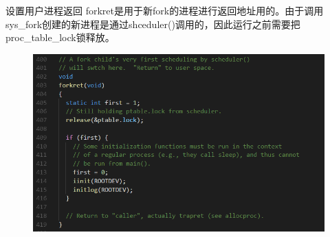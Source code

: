\documentclass[a4paper,12pt]{report}
\begin{document}
设置用户进程返回
forkret是用于新fork的进程进行返回地址用的。由于调用sys\_fork创建的新进程是通过shceduler()调用的，因此运行之前需要把proc\_table\_lock锁释放。
\begin{figure}[H]
	\centering
	\includegraphics [width=1.0\textwidth]{figure//image108.png}
\end{figure}
\end{document}
